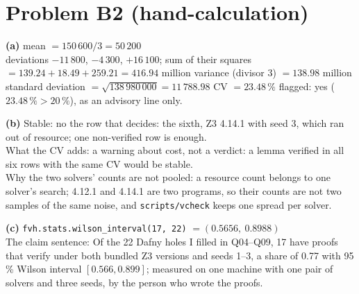 \documentclass[11pt]{article}
\begin{document}
\section*{Problem B2 (hand-calculation)}\label{ans:B2}
\begin{answer}
\textbf{(a)} mean $= 150\,600/3 = 50\,200$ \\
deviations $-11\,800$, $-4\,300$, $+16\,100$; sum of their squares
$= 139.24 + 18.49 + 259.21 = 416.94$ million \quad variance (divisor 3)
$= 138.98$ million \\
standard deviation $= \sqrt{138\,980\,000} = 11\,788.98$ \quad CV $= 23.48\,\%$
\quad flagged: yes ($23.48\,\% > 20\,\%$), as an advisory line only.

\textbf{(b)} Stable: no \quad the row that decides: the sixth, Z3 4.14.1 with
seed 3, which ran out of resource; one non-verified row is enough. \\
What the CV adds: a warning about cost, not a verdict: a lemma verified in
all six rows with the same CV would be stable. \\
Why the two solvers' counts are not pooled: a resource count belongs to one
solver's search; 4.12.1 and 4.14.1 are two programs, so their counts are not
two samples of the same noise, and \texttt{scripts/vcheck} keeps one spread
per solver.

\textbf{(c)} \texttt{fvh.stats.wilson\_interval(17, 22)} $= (0.5656,\ 0.8988)$ \\
The claim sentence: Of the 22 Dafny holes I filled in Q04--Q09, 17 have proofs
that verify under both bundled Z3 versions and seeds 1--3, a share of 0.77 with
95\,\% Wilson interval $[0.566, 0.899]$; measured on one machine with one pair of
solvers and three seeds, by the person who wrote the proofs.
\end{answer}

\end{document}
